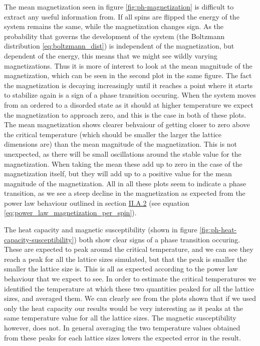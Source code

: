 \documentclass[reprint,english,notitlepage]{revtex4-1}  %
\begin{document}
The mean magnetization seen in figure \ref{fig:ph-magnetization} is difficult to extract any useful information from. If all spins are flipped the energy of the system remains the same, while the magnetization changes sign. As the probability that governs the development of the system (the Boltzmann distribution \eqref{eq:boltzmann_dist}) is independent of the magnetization, but dependent of the energy, this means that we might see wildly varying magnetizations. Thus it is more of interest to look at the mean magnitude of the magnetization, which can be seen in the second plot in the same figure. The fact the magnetization is decaying increasingly until it reaches a point where it starts to stabilize again is a sign of a phase transition occuring. When the system moves from an ordered to a disorded state as it should at higher temperature we expect the magnetization to approach zero, and this is the case in both of these plots. The mean magnetization shows clearer behvaiour of getting closer to zero above the critical temperature (which should be smaller the larger the lattice dimensions are) than the mean magnitude of the magnetization. This is not unexpected, as there will be small oscillations around the stable value for the magnetization. When taking the mean these add up to zero in the case of the magnetization itself, but they will add up to a positive value for the mean magnitude of the magnetization. All in all these plots seem to indicate a phase transition, as we see a steep decline in the magnetization as expected from the power law behaviour outlined in section \hyperref[sec:II:A:ii]{II.A.2} (see equation \eqref{eq:power_law_magnetization_per_spin}). 

The heat capacity and magnetic susceptibility (shown in figure \ref{fig:ph-heat-capacity-susceptibility}) both show clear signs of a phase transition  occuring. These are expected to peak around the critical temperature, and we can see they reach a peak for all the lattice sizes simulated, but that the peak is smaller the smaller the lattice size is. This is all as expected according to the power law behaviour that we expect to see. In order to estimate the critical temperatures we identified the temperature at which these two quantities peaked for all the lattice sizes, and averaged them. We can clearly see from the plots shown that if we used only the heat capacity our results would be very interesting as it peaks at the same temperature value for all the lattice sizes. The magnetic susceptibility however, does not. In general averaging the two temperature values obtained from these peaks for each lattice sizes lowers the expected error in the result. 
\end{document}
